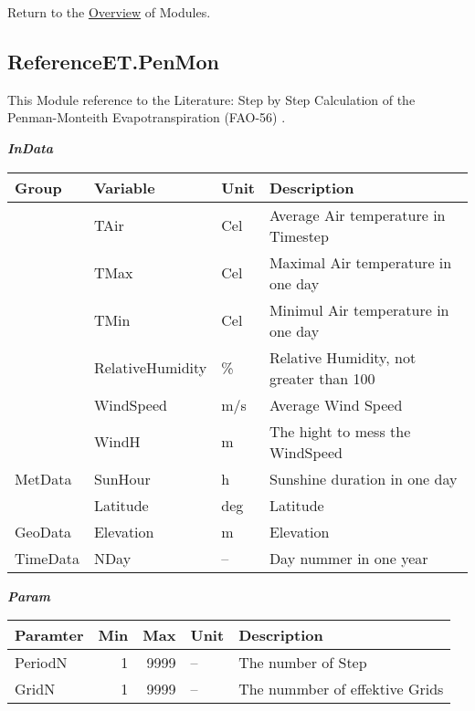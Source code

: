 \documentclass[
]{book}
\begin{document}
Return to the \protect\hyperlink{module}{Overview} of Modules.

\hypertarget{ReferenceET.PenMon}{%
\subsection{ReferenceET.PenMon}\label{ReferenceET.PenMon}}

This Module reference to the Literature: Step by Step Calculation of the Penman-Monteith Evapotranspiration (FAO-56) \citep{LincolnZotarelli.2014}.

\textbf{\emph{InData}}

\begin{table}[!h]
\centering
\begin{tabular}{l|l|l|l}
\hline
Group & Variable & Unit & Description\\
\hline
 & TAir & Cel & Average Air temperature in Timestep\\
\cline{2-4}
 & TMax & Cel & Maximal Air temperature in one day\\
\cline{2-4}
 & TMin & Cel & Minimul Air temperature in one day\\
\cline{2-4}
 & RelativeHumidity & \% & Relative Humidity, not greater than 100\\
\cline{2-4}
 & WindSpeed & m/s & Average Wind Speed\\
\cline{2-4}
 & WindH & m & The hight to mess the WindSpeed\\
\cline{2-4}
\multirow{-7}{*}{\raggedright\arraybackslash MetData} & SunHour & h & Sunshine duration in one day\\
\cline{1-4}
 & Latitude & deg & Latitude\\
\cline{2-4}
\multirow{-2}{*}{\raggedright\arraybackslash GeoData} & Elevation & m & Elevation\\
\cline{1-4}
TimeData & NDay & -- & Day nummer in one year\\
\hline
\end{tabular}
\end{table}

\textbf{\emph{Param}}

\begin{table}[!h]
\centering
\begin{tabular}{l|r|r|l|l}
\hline
Paramter & Min & Max & Unit & Description\\
\hline
PeriodN & 1 & 9999 & -- & The number of Step\\
\cline{1-5}
GridN & 1 & 9999 & -- & The nummber of effektive Grids\\
\hline
\end{tabular}
\end{table}
\end{document}
